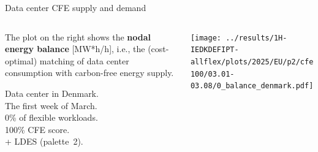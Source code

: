 \begin{frame}{Data center CFE supply and demand}
  \label{nbp2-DK-0}

  {\footnotesize
  
  \begin{columns}[T]
    \begin{column}{3.5cm}
      \vspace{0.3cm}
      The plot on the right shows the {\bf nodal energy balance} [MW*h/h], i.e., the (cost-optimal) matching of data center consumption with carbon-free energy supply.

      \vspace{0.2cm}
      Data center in Denmark. \\
      The first week of March. \\
      0\% of flexible workloads.\\
      100\% CFE score.\\
      + LDES (palette~2). \\

    \end{column}
  
    \begin{column}{11cm}
      \texttt{[image: ../results/1H-IEDKDEFIPT-allflex/plots/2025/EU/p2/cfe100/03.01-03.08/0\_balance\_denmark.pdf]}
    \end{column}
    \end{columns}
    } 

\end{frame}



